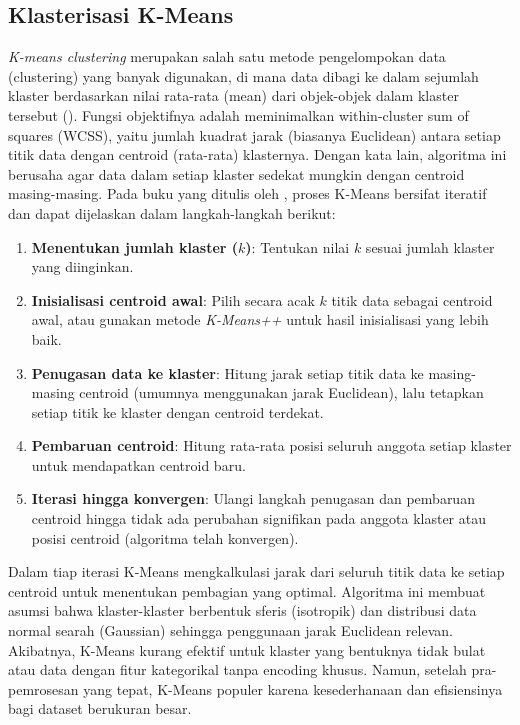 \subsection{Klasterisasi K-Means}
\textit{K-means clustering} merupakan salah satu metode pengelompokan data (clustering) yang banyak digunakan, di mana data dibagi ke dalam sejumlah klaster berdasarkan nilai rata-rata (mean) dari objek-objek dalam klaster tersebut (\cite{Ikotun2023}). Fungsi objektifnya adalah meminimalkan within-cluster sum of squares (WCSS), yaitu jumlah kuadrat jarak (biasanya Euclidean) antara setiap titik data dengan centroid (rata-rata) klasternya. Dengan kata lain, algoritma ini berusaha agar data dalam setiap klaster sedekat mungkin dengan centroid masing-masing.
Pada buku yang ditulis oleh \textcite{VanderPlas2016}, proses K-Means bersifat iteratif dan dapat dijelaskan dalam langkah-langkah berikut:
\begin{enumerate}
    \item \textbf{Menentukan jumlah klaster ($k$)}: Tentukan nilai $k$ sesuai jumlah klaster yang diinginkan.
    \item \textbf{Inisialisasi centroid awal}: Pilih secara acak $k$ titik data sebagai centroid awal, atau gunakan metode \textit{K-Means++} untuk hasil inisialisasi yang lebih baik.
    \item \textbf{Penugasan data ke klaster}: Hitung jarak setiap titik data ke masing-masing centroid (umumnya menggunakan jarak Euclidean), lalu tetapkan setiap titik ke klaster dengan centroid terdekat.
    \item \textbf{Pembaruan centroid}: Hitung rata-rata posisi seluruh anggota setiap klaster untuk mendapatkan centroid baru.
    \item \textbf{Iterasi hingga konvergen}: Ulangi langkah penugasan dan pembaruan centroid hingga tidak ada perubahan signifikan pada anggota klaster atau posisi centroid (algoritma telah konvergen).
\end{enumerate}
Dalam tiap iterasi K-Means mengkalkulasi jarak dari seluruh titik data ke setiap centroid untuk menentukan pembagian yang optimal. Algoritma ini membuat asumsi bahwa klaster-klaster berbentuk sferis (isotropik) dan distribusi data normal searah (Gaussian) sehingga penggunaan jarak Euclidean relevan. Akibatnya, K-Means kurang efektif untuk klaster yang bentuknya tidak bulat atau data dengan fitur kategorikal tanpa encoding khusus. Namun, setelah pra-pemrosesan yang tepat, K-Means populer karena kesederhanaan dan efisiensinya bagi dataset berukuran besar.

